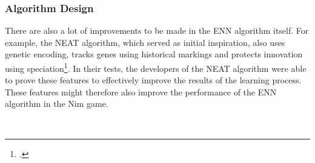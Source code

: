 \subsubsection{Algorithm Design}
There are also a lot of improvements to be made in the ENN algorithm itself.
For example, the NEAT algorithm, which served as initial inspiration, also uses genetic encoding, tracks genes using historical markings and protects innovation using speciation\footcite{Neat_02}.
In their tests, the developers of the NEAT algorithm were able to prove these features to effectively improve the results of the learning process.
These features might therefore also improve the performance of the ENN algorithm in the Nim game.



\cleardoublepage %
\printbibliography[title=References]
\\
\vspace*{3em}
\setlength{\fboxsep}{10pt} %
\noindent
{}
